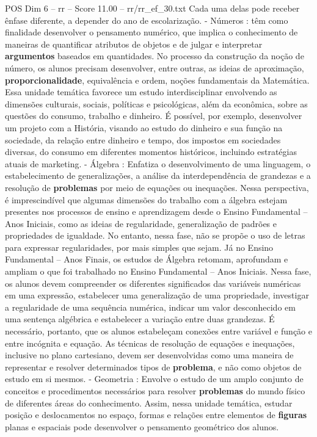 \begin{textsample}{POS Dim 6 – rr – Score 11.00 – rr/rr\_ef\_30.txt}
Cada uma delas pode receber ênfase diferente, a depender do ano de escolarização. - Números : têm como finalidade desenvolver o pensamento numérico, que implica o conhecimento de maneiras de quantificar atributos de objetos e de julgar e interpretar \textbf{argumentos} baseados em quantidades.
No processo da construção da noção de número, os alunos precisam desenvolver, entre outras, as ideias de aproximação, \textbf{proporcionalidade}, equivalência e ordem, noções fundamentais da Matemática.
Essa unidade temática favorece um estudo interdisciplinar envolvendo as dimensões culturais, sociais, políticas e psicológicas, além da econômica, sobre as questões do consumo, trabalho e dinheiro.
É possível, por exemplo, desenvolver um projeto com a História, visando ao estudo do dinheiro e sua função na sociedade, da relação entre dinheiro e tempo, dos impostos em sociedades diversas, do consumo em diferentes momentos históricos, incluindo estratégias atuais de marketing. - Álgebra : Enfatiza o desenvolvimento de uma linguagem, o estabelecimento de generalizações, a análise da interdependência de grandezas e a resolução de \textbf{problemas} por meio de equações ou inequações.
Nessa perspectiva, é imprescindível que algumas dimensões do trabalho com a álgebra estejam presentes nos processos de ensino e aprendizagem desde o Ensino Fundamental – Anos Iniciais, como as ideias de regularidade, generalização de padrões e propriedades de igualdade.
No entanto, nessa fase, não se propõe o uso de letras para expressar regularidades, por mais simples que sejam.
Já no Ensino Fundamental – Anos Finais, os estudos de Álgebra retomam, aprofundam e ampliam o que foi trabalhado no Ensino Fundamental – Anos Iniciais.
Nessa fase, os alunos devem compreender os diferentes significados das variáveis numéricas em uma expressão, estabelecer uma generalização de uma propriedade, investigar a regularidade de uma sequência numérica, indicar um valor desconhecido em uma sentença algébrica e estabelecer a variação entre duas grandezas.
É necessário, portanto, que os alunos estabeleçam conexões entre variável e função e entre incógnita e equação.
As técnicas de resolução de equações e inequações, inclusive no plano cartesiano, devem ser desenvolvidas como uma maneira de representar e resolver determinados tipos de \textbf{problema}, e não como objetos de estudo em si mesmos. - Geometria : Envolve o estudo de um amplo conjunto de conceitos e procedimentos necessários para resolver \textbf{problemas} do mundo físico de diferentes áreas do conhecimento.
Assim, nessa unidade temática, estudar posição e deslocamentos no espaço, formas e relações entre elementos de \textbf{figuras} planas e espaciais pode desenvolver o pensamento geométrico dos alunos.

\end{textsample}
